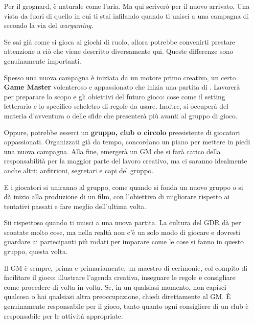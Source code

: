 
Per il grognard, è naturale come l'aria. Ma qui scriverò per il nuovo arrivato. Una vista da fuori di quello in cui ti stai infilando quando ti unisci a una campagna di \dnd secondo la via del \textit{wargaming}.

Se sai già come si gioca ai giochi di ruolo, allora potrebbe convenirti prestare attenzione a ciò che viene descritto diversamente qui. Queste differenze sono genuinamente importanti.


Spesso una nuova campagna è iniziata da un motore primo creativo, un certo \textbf{Game Master} volenteroso e appassionato che inizia una partita di \dnd. Lavorerà per preparare lo scopo e gli obiettivi del futuro gioco: cose come il setting letterario e lo specifico scheletro di regole da usare. Inoltre, si occuperà del materia d'avventura o delle sfide che presenterà più avanti al gruppo di gioco.

Oppure, potrebbe esserci un \textbf{gruppo, club o circolo} preesistente di giocatori appassionati. Organizzati già da tempo, concordano un piano per mettere in piedi una nuova campagna. Alla fine, emergerà un GM che si farà carico della responsabilità per la maggior parte del lavoro creativo, ma ci saranno idealmente anche altri: anfitrioni, segretari e capi del gruppo.

E i giocatori si uniranno al gruppo, come quando si fonda un nuovo gruppo o si dà inizio alla produzione di un film, con l'obiettivo di migliorare rispetto ai tentativi passati e fare meglio dell'ultima volta.


Sii rispettoso quando ti unisci a una nuova partita. La cultura del GDR dà per scontate molto cose, ma nella realtà non c'è un solo modo di giocare e dovresti guardare ai partecipanti più rodati per imparare come le cose si fanno in questo gruppo, questa volta.

Il GM è sempre, prima e primariamente, un maestro di cerimonie, col compito di facilitare il gioco: illustrare l'agenda creativa, insegnare le regole e consigliare come procedere di volta in volta. Se, in un qualsiasi momento, non capisci qualcosa o hai qualsiasi altra preoccupazione, chiedi direttamente al GM. È genuinamente responsabile per il gioco, tanto quanto ogni consigliere di un club è responsabile per le attività appropriate.

